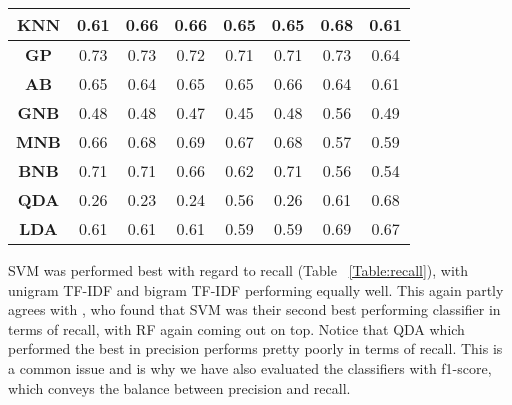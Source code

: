 \begin{table}[h!]
{\begin{tabular}{cccccccc}
\rowcolor[HTML]{EFEFEF} 
\textbf{KNN} & 0.61 & 0.66 & 0.66 & 0.65 & 0.65 & 0.68 & 0.61  \\ \hline
\textbf{GP} & 0.73 & 0.73 & 0.72 & 0.71 & 0.71 & 0.73 & 0.64  \\ \hline
\rowcolor[HTML]{EFEFEF} 
\textbf{AB} & 0.65 & 0.64 & 0.65 & 0.65 & 0.66 & 0.64 & 0.61  \\ \hline
\textbf{GNB} & 0.48 & 0.48 & 0.47 & 0.45 & 0.48 & 0.56 & 0.49  \\ \hline
\rowcolor[HTML]{EFEFEF} 
\textbf{MNB} & \multicolumn{1}{c}{\cellcolor[HTML]{EFEFEF}0.66} & 0.68 & 0.69 & 0.67 & 0.68 & 0.57 & 0.59  \\ \hline
\rowcolor[HTML]{FFFFFF} 
\textbf{BNB} & 0.71 & 0.71 & 0.66 & 0.62 & 0.71 & 0.56 & 0.54  \\ \hline
\rowcolor[HTML]{EFEFEF} 
\textbf{QDA} & 0.26 & 0.23 & 0.24 & 0.56 & 0.26 & 0.61 & 0.68  \\ \hline
\rowcolor[HTML]{FFFFFF} 
\textbf{LDA} & 0.61 & 0.61 & 0.61 & 0.59 & 0.59 & 0.69 & 0.67  \\ \hline
\end{tabular}}
\end{table}

SVM was performed best with regard to recall (Table ~\ref{Table:recall}), with unigram TF-IDF and bigram TF-IDF performing equally well. This again partly agrees with \cite{Rane2018}, who found that SVM was their second best performing classifier in terms of recall, with RF again coming out on top. Notice that QDA which performed the best in precision performs pretty poorly in terms of recall. This is a common issue and is why we have also evaluated the classifiers with f1-score, which conveys the balance between precision and recall.

